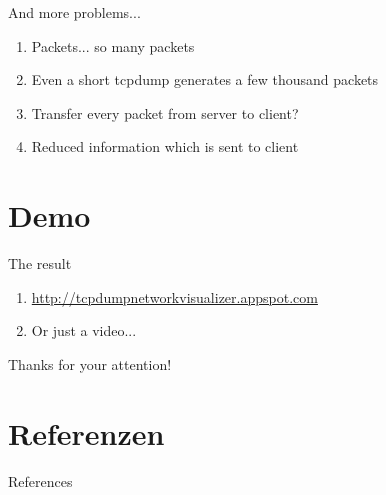 \documentclass{beamer}
\begin{document}
\begin{frame}{And more problems...}
 \begin{enumerate}
  \item Packets... so many packets
  \item Even a short tcpdump generates a few thousand packets
  \item Transfer every packet from server to client?
  \item Reduced information which is sent to client
 \end{enumerate}
\end{frame}

\section{Demo}

\begin{frame}{The result}
\begin{enumerate}
 \item \url{http://tcpdumpnetworkvisualizer.appspot.com}
 \item Or just a video...
\end{enumerate}
\end{frame}


\begin{frame}
  Thanks for your attention!
\end{frame}


\section{Referenzen}

\begin{frame}{References}
\printbibliography
\end{frame}
\end{document}
